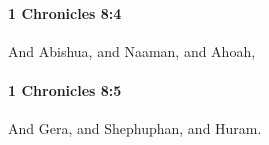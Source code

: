 		\paragraph{1 Chronicles 8:4} %
			\label{1CHRONICLES-8-4}

			And Abishua, and Naaman, and Ahoah,


		\paragraph{1 Chronicles 8:5} %
			\label{1CHRONICLES-8-5}

			And Gera, and Shephuphan, and Huram.


